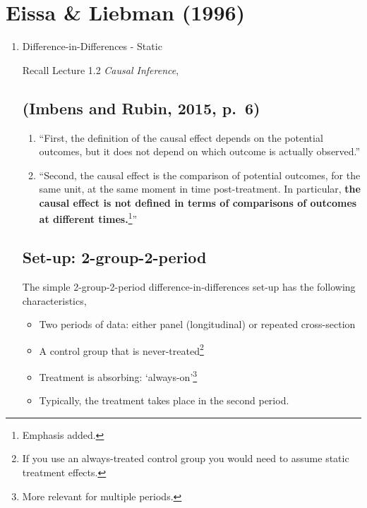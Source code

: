 \documentclass[
  letterpaper,
  DIV=11,
  numbers=noendperiod]{scrreprt}
\providecommand{\tightlist}{%
  \setlength{\itemsep}{0pt}\setlength{\parskip}{0pt}}\usepackage{longtable,booktabs,array}
\theoremstyle{definition}
\theoremstyle{remark}
\begin{document}
\chapter{Eissa \& Liebman (1996)}\label{eissa-liebman-1996}

\begin{enumerate}
\def\labelenumi{\arabic{enumi}.}
\item
  Difference-in-Differences - Static

  Recall Lecture 1.2 \emph{Causal Inference},

  \section{(Imbens and Rubin, 2015,
  p.~6)}\label{imbens-and-rubin-2015-p.-6}

  \begin{enumerate}
  \def\labelenumii{\arabic{enumii}.}
  \tightlist
  \item
    ``First, the definition of the causal effect depends on the
    potential outcomes, but it does not depend on which outcome is
    actually observed.''
  \item
    ``Second, the causal effect is the comparison of potential outcomes,
    for the same unit, at the same moment in time post-treatment. In
    particular, \textbf{the causal effect is not defined in terms of
    comparisons of outcomes at different times.}\footnote{Emphasis
      added.}''
  \end{enumerate}

  \section{Set-up: 2-group-2-period}\label{set-up-2-group-2-period}

  The simple 2-group-2-period difference-in-differences set-up has the
  following characteristics,

  \begin{itemize}
  \tightlist
  \item
    Two periods of data: either panel (longitudinal) or repeated
    cross-section
  \item
    A control group that is never-treated\footnote{If you use an
      always-treated control group you would need to assume static
      treatment effects.}
  \item
    Treatment is absorbing: `always-on'\footnote{More relevant for
      multiple periods.}
  \item
    Typically, the treatment takes place in the second period.
  \end{itemize}


\end{enumerate}
\end{document}
